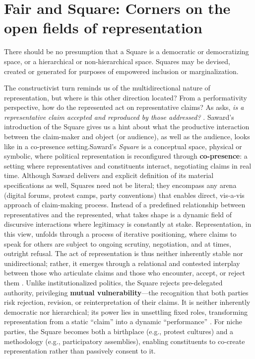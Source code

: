 
\section{Fair and Square: Corners on the open fields of representation}

\epigraph{There should be no presumption that a Square is a democratic or democratizing space, or a hierarchical or non-hierarchical space. Squares may be devised, created or generated for purposes of empowered inclusion or marginalization.}{\cite[11]{saward2024}}


The constructivist turn \parencite[]{disch2015} reminds us of the multidirectional nature of representation, but where is this other direction located? From a performativity perspective, how do the represented act on representative claims? As \cite{kim2024} asks, \textit{is a representative claim accepted and reproduced by those addressed?} \parencite[4]{kim2024}. Saward's introduction of the Square gives us a hint about what the productive interaction between the claim-maker and object (or audience), as well as the audience, looks like in a co-presence setting.Saward’s \textit{Square} is a conceptual space, physical or symbolic, where political representation is reconfigured through \textbf{co-presence}: a setting where representatives and constituents interact, negotiating claims in real time. Although Saward delivers and explicit definition of its material specifications as well, Squares need not be literal; they encompass any arena (digital forums, protest camps, party conventions) that enables direct, vis-a-vis approach of claim-making process. Instead of a predefined relationship between representatives and the represented, what takes shape is a dynamic field of discursive interactions where legitimacy is constantly at stake. Representation, in this view, unfolds through a process of iterative positioning, where claims to speak for others are subject to ongoing scrutiny, negotiation, and at times, outright refusal. The act of representation is thus neither inherently stable nor unidirectional; rather, it emerges through a relational and contested interplay between those who articulate claims and those who encounter, accept, or reject them \parencite[see 6]{kim2024}.
Unlike institutionalized politics, the Square rejects pre-delegated authority, privileging \textbf{mutual vulnerability}—the recognition that both parties risk rejection, revision, or reinterpretation of their claims. It is neither inherently democratic nor hierarchical; its power lies in unsettling fixed roles, transforming representation from a static \enquote{claim} into a dynamic \enquote{performance} \parencite[5, 11]{saward2024}. For niche parties, the Square becomes both a birthplace (e.g., protest cultures) and a methodology (e.g., participatory assemblies), enabling constituents to co-create representation rather than passively consent to it.

